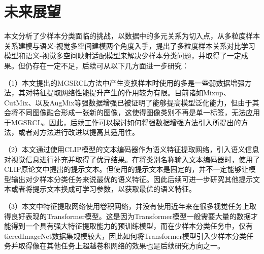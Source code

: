 \section[\hspace{-2pt}未来展望]{{\heiti{} \hspace{-8pt}未来展望}}\label{section5: 未来展望}

本文分析了少样本分类面临的挑战，以数据中的多元关系为切入点，从多粒度样本关系建模与语义-视觉多空间建模两个角度入手，提出了多粒度样本关系对比学习模型和语义-视觉多空间映射适配模型来解决少样本分类问题，并取得了一定成果。但仍存在一定不足，后续可从以下几方面进一步研究：

（1）本文提出的MGSRCL方法中产生变换样本时使用的多是一些弱数据增强方法，其对特征提取网络性能提升产生的作用较为有限。目前诸如Mixup、CutMix、以及AugMix等强数据增强已被证明了能够提高模型泛化能力，但由于其会将不同图像融合形成一张新的图像，这使得图像类别不再是单一标签，无法应用于MGSRCL。因此，后续工作可以探讨如何将强数据增强方法引入所提出的方法，或者对方法进行改进以提高其适用性。

（2）本文通过使用CLIP模型的文本编码器作为语义特征提取网络，引入语义信息对视觉信息进行补充并取得了优异结果。在将类别名称输入文本编码器时，使用了CLIP原论文中提出的提示文本。但使用的提示文本是固定的，并不一定能够让模型输出对少样本分类任务来说最优的语义特征。因此后续可进一步研究其他提示文本或者将提示文本换成可学习参数，以获取最优的语义特征。

（3）本文中特征提取网络使用卷积网络，并没有使用近年来在很多视觉任务上取得良好表现的Transformer模型。这是因为Transformer模型一般需要大量的数据才能得到一个具有强大特征提取能力的预训练模型，而在少样本分类任务中，仅有tieredImageNet数据集规模较大，因此如何将Transformer模型引入少样本分类任务并取得像在其他任务上超越卷积网络的效果也是后续研究方向之一。
